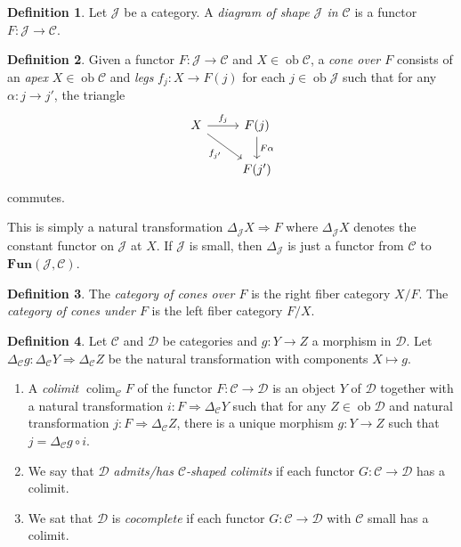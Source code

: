 \documentclass[10pt,letterpaper,cm]{nupset}
\theoremstyle{definition}
\newtheorem{definition}{Definition}[section]
\theoremstyle{theorem}
\theoremstyle{remark}
\newcommand{\1}{\mathbf{1}}
\renewcommand{\c}{\mathscr{C}}
\renewcommand{\d}{\mathscr{D}}
\renewcommand{\j}{\mathscr{J}}
\newcommand{\0}{\vec 0}
\DeclareMathOperator{\ob}{ob}
\DeclareMathOperator{\colim}{colim}
\begin{document}
\medskip

\begin{definition}
Let $\j$ be a category. A \textit{diagram of shape $\j$ in $\c$} is a functor $F: \j \to \c$.
\end{definition}

\begin{definition}
Given a functor $F: \j \to \c$ and $X \in \ob \c$, a \textit{cone over $F$} consists of an \textit{apex} $X\in \ob \c$ and \textit{legs} $f_j : X \to F(j)$ for each $j \in \ob \j$ such that for any $\alpha : j \to j'$, the triangle
\[ \begin{tikzcd}
X \arrow[r, "f_j"] \arrow[swap, dr,  " f_{j'} "] & F(j) \arrow[d, "F\alpha"] \\
 & F(j')
\end{tikzcd}
\]
commutes.
\end{definition}

 This is simply a natural transformation $\Delta_{\j} X \Rightarrow F$ where $\Delta_{\j} X$ denotes the constant functor on $\j$ at $X$. If $\j$ is small, then $\Delta_{\j}$ is just a functor from $\c$ to $\mathbf{Fun}(\j, \c)$.

\begin{definition}
The \textit{category of cones over $F$} is the right fiber category $X/F$. The \textit{category of cones under $F$} is the left fiber category  $F/X$.
\end{definition}

\begin{definition}
Let $\c$ and $\d$ be categories and $g: Y \to Z$ a morphism in $\d$. Let $\Delta_{\c} g : \Delta_{\c} Y \Rightarrow \Delta_{\c} Z$ be the natural transformation with components $X \mapsto g$. 
\begin{enumerate}
\item A \textit{colimit  $\colim_{\c}{F}$} of the functor $F: \c \to \d$ is an object $Y$ of $\d$ together with a natural transformation $i : F \Rightarrow \Delta_{\c} Y$ such that for any $Z \in \ob \d$ and natural transformation $j: F \Rightarrow \Delta_{\c} Z$, there is a unique morphism $g: Y \to Z$ such that $j = \Delta_{\c}g \circ i$.
\item  We say that $\d$ \textit{admits/has  $\c$-shaped colimits} if each functor $G: \c \to \d$ has a colimit.
\item We sat that $\d$ is \textit{cocomplete} if each functor $G : \c \to \d$ with $\c$ small has a colimit.
\end{enumerate}
\end{definition}
\end{document}
